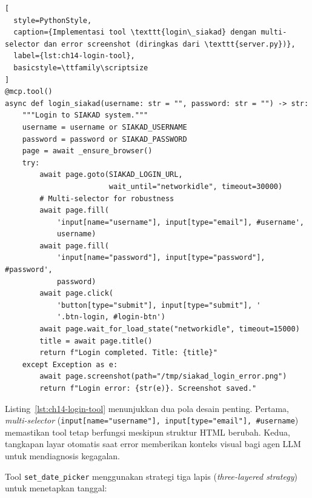 \begin{lstlisting}[
  style=PythonStyle,
  caption={Implementasi tool \texttt{login\_siakad} dengan multi-selector dan error screenshot (diringkas dari \texttt{server.py})},
  label={lst:ch14-login-tool},
  basicstyle=\ttfamily\scriptsize
]
@mcp.tool()
async def login_siakad(username: str = "", password: str = "") -> str:
    """Login to SIAKAD system."""
    username = username or SIAKAD_USERNAME
    password = password or SIAKAD_PASSWORD
    page = await _ensure_browser()
    try:
        await page.goto(SIAKAD_LOGIN_URL,
                        wait_until="networkidle", timeout=30000)
        # Multi-selector for robustness
        await page.fill(
            'input[name="username"], input[type="email"], #username',
            username)
        await page.fill(
            'input[name="password"], input[type="password"], #password',
            password)
        await page.click(
            'button[type="submit"], input[type="submit"], '
            '.btn-login, #login-btn')
        await page.wait_for_load_state("networkidle", timeout=15000)
        title = await page.title()
        return f"Login completed. Title: {title}"
    except Exception as e:
        await page.screenshot(path="/tmp/siakad_login_error.png")
        return f"Login error: {str(e)}. Screenshot saved."
\end{lstlisting}

\noindent Listing~\ref{lst:ch14-login-tool} menunjukkan dua pola desain penting. Pertama, \textit{multi-selector} (\texttt{input[name="username"], input[type="email"], \#username}) memastikan tool tetap berfungsi meskipun struktur HTML berubah. Kedua, tangkapan layar otomatis saat error memberikan konteks visual bagi agen LLM untuk mendiagnosis kegagalan.

Tool \texttt{set\_date\_picker} menggunakan strategi tiga lapis (\textit{three-layered strategy}) untuk menetapkan tanggal:

